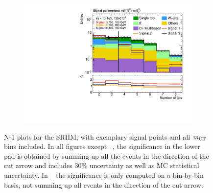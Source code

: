 \begin{figure}
\begin{subfigure}[b]{0.4\linewidth}
		\caption{\label{fig:Wh_reopt_second_round_n1_srhm_mlb1}}
	\end{subfigure}%
	\begin{subfigure}[b]{0.4\linewidth}
		\centering\includegraphics[width=\textwidth]{n1_SRHM_mct_bins/nJet30.pdf}
		\caption{\label{fig:Wh_reopt_second_round_n1_srhm_njet}}
	\end{subfigure}
	\caption{N-1 plots for the SRHM, with exemplary signal points and all $m_{\textrm{CT}}$ bins included. In all figures except \figname~, the significance in the lower pad is obtained by summing up all the events in the direction of the cut arrow and includes 30\% uncertainty as well as MC statistical uncertainty. In \figname~ the significance is only computed on a bin-by-bin basis, \ie not summing up all events in the direction of the cut arrow.}
	\label{fig:Wh_reopt_second_round_n1_srhm}
\end{figure}




